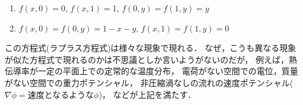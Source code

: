 \documentclass[12pt,dvipdfmx]{article}
\begin{document}
\begin{enumerate}
\item $f(x, 0) = 0$, $f(x, 1) = 1$, $f(0, y) = f(1, y) = y$
\item $f(x, 0) = f(0, y) = 1 - x - y$, $f(x, 1) = f(1, y) = 0$
\end{enumerate}

この方程式(ラプラス方程式)は様々な現象で現れる．
なぜ，こうも異なる現象が似た方程式で現れるのかは不思議としか言いようがないのだが，
例えば，熱伝導率が一定の平面上での定常的な温度分布，
電荷がない空間での電位，質量がない空間での重力ポテンシャル，
非圧縮渦なしの流れの速度ポテンシャル($\nabla \phi = $速度となるような$\phi$)，
などが上記を満たす．
\end{document}
